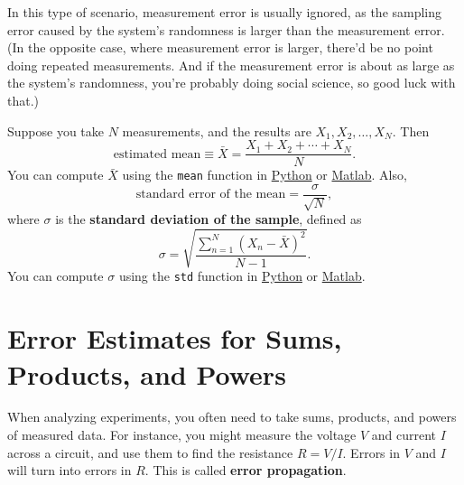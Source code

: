\documentclass[11pt,a4paper]{article}
\begin{document}
In this type of scenario, measurement error is usually ignored, as the
sampling error caused by the system's randomness is larger than the
measurement error.  (In the opposite case, where measurement error is
larger, there'd be no point doing repeated measurements.  And if the
measurement error is about as large as the system's randomness, you're
probably doing social science, so good luck with that.)

Suppose you take $N$ measurements, and the results are $X_1, X_2,
\dots, X_N$.  Then
\begin{equation*}
  \textrm{estimated mean} \equiv \bar{X} = \frac{X_1 + X_2 + \cdots + X_N}{N}.
\end{equation*}
You can compute $\bar{X}$ using the \texttt{mean} function in
\href{https://docs.scipy.org/doc/numpy/reference/generated/numpy.mean.html}{Python}
or \href{https://www.mathworks.com/help/matlab/ref/mean.html}{Matlab}.
Also,
\begin{equation*}
  \textrm{standard error of the mean} = \frac{\sigma}{\sqrt{N}},
\end{equation*}
where $\sigma$ is the \textbf{standard deviation of the sample},
defined as
\begin{equation*}
  \sigma = \sqrt{\frac{\sum_{n=1}^N(X_n-\bar{X})^2}{N-1}}.
\end{equation*}
You can compute $\sigma$ using the \texttt{std} function in
\href{https://docs.scipy.org/doc/numpy/reference/generated/numpy.std.html}{Python}
or \href{https://www.mathworks.com/help/matlab/ref/std.html}{Matlab}.

\section{Error Estimates for Sums, Products, and Powers}
\label{sec:propagation}

When analyzing experiments, you often need to take sums, products, and
powers of measured data.  For instance, you might measure the voltage
$V$ and current $I$ across a circuit, and use them to find the
resistance $R = V/I$.  Errors in $V$ and $I$ will turn into errors in
$R$.  This is called \textbf{error propagation}.
\end{document}
